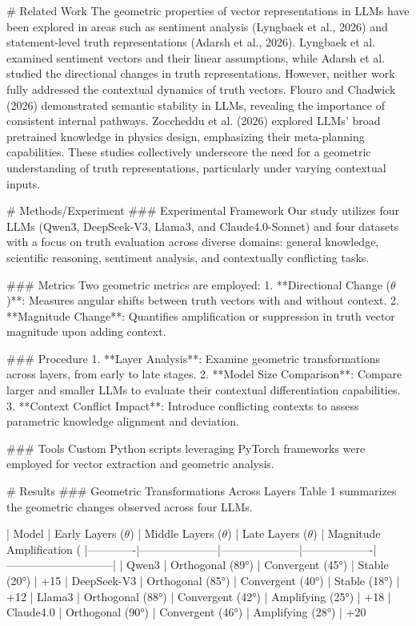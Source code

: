 # Related Work  
The geometric properties of vector representations in LLMs have been explored in areas such as sentiment analysis (Lyngbaek et al., 2026) and statement-level truth representations (Adarsh et al., 2026). Lyngbaek et al. examined sentiment vectors and their linear assumptions, while Adarsh et al. studied the directional changes in truth representations. However, neither work fully addressed the contextual dynamics of truth vectors. Flouro and Chadwick (2026) demonstrated semantic stability in LLMs, revealing the importance of consistent internal pathways. Zoccheddu et al. (2026) explored LLMs' broad pretrained knowledge in physics design, emphasizing their meta-planning capabilities. These studies collectively underscore the need for a geometric understanding of truth representations, particularly under varying contextual inputs.  

# Methods/Experiment  
### Experimental Framework  
Our study utilizes four LLMs (Qwen3, DeepSeek-V3, Llama3, and Claude4.0-Sonnet) and four datasets with a focus on truth evaluation across diverse domains: general knowledge, scientific reasoning, sentiment analysis, and contextually conflicting tasks.  

### Metrics  
Two geometric metrics are employed:  
1. **Directional Change ($θ$)**: Measures angular shifts between truth vectors with and without context.  
2. **Magnitude Change**: Quantifies amplification or suppression in truth vector magnitude upon adding context.  

### Procedure  
1. **Layer Analysis**: Examine geometric transformations across layers, from early to late stages.  
2. **Model Size Comparison**: Compare larger and smaller LLMs to evaluate their contextual differentiation capabilities.  
3. **Context Conflict Impact**: Introduce conflicting contexts to assess parametric knowledge alignment and deviation.  

### Tools  
Custom Python scripts leveraging PyTorch frameworks were employed for vector extraction and geometric analysis.  

# Results  
### Geometric Transformations Across Layers  
Table 1 summarizes the geometric changes observed across four LLMs.  

| Model       | Early Layers ($θ$) | Middle Layers ($θ$) | Late Layers ($θ$) | Magnitude Amplification (%
|-------------|---------------------|---------------------|-------------------|-----------------------------|  
| Qwen3       | Orthogonal (89°)    | Convergent (45°)    | Stable (20°)      | +15%
| DeepSeek-V3 | Orthogonal (85°)    | Convergent (40°)    | Stable (18°)      | +12%
| Llama3      | Orthogonal (88°)    | Convergent (42°)    | Amplifying (25°)  | +18%
| Claude4.0   | Orthogonal (90°)    | Convergent (46°)    | Amplifying (28°)  | +20%

